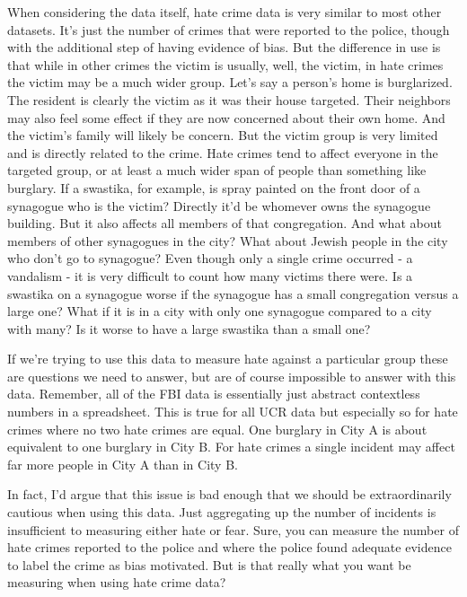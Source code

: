 \documentclass[
]{krantz}
\begin{document}
When considering the data itself, hate crime data is very
similar to most other datasets. It's just the number of
crimes that were reported to the police, though with the
additional step of having evidence of bias. But the
difference in use is that while in other crimes the victim
is usually, well, the victim, in hate crimes the victim may
be a much wider group. Let's say a person's home is
burglarized. The resident is clearly the victim as it was
their house targeted. Their neighbors may also feel some
effect if they are now concerned about their own home. And
the victim's family will likely be concern. But the victim
group is very limited and is directly related to the crime.
Hate crimes tend to affect everyone in the targeted group,
or at least a much wider span of people than something like
burglary. If a swastika, for example, is spray painted on
the front door of a synagogue who is the victim? Directly
it'd be whomever owns the synagogue building. But it also
affects all members of that congregation. And what about
members of other synagogues in the city? What about Jewish
people in the city who don't go to synagogue? Even though
only a single crime occurred - a vandalism - it is very
difficult to count how many victims there were. Is a
swastika on a synagogue worse if the synagogue has a small
congregation versus a large one? What if it is in a city
with only one synagogue compared to a city with many? Is it
worse to have a large swastika than a small one?

If we're trying to use this data to measure hate against a
particular group these are questions we need to answer, but
are of course impossible to answer with this data. Remember,
all of the FBI data is essentially just abstract contextless
numbers in a spreadsheet. This is true for all UCR data but
especially so for hate crimes where no two hate crimes are
equal. One burglary in City A is about equivalent to one
burglary in City B. For hate crimes a single incident may
affect far more people in City A than in City B.

In fact, I'd argue that this issue is bad enough that we
should be extraordinarily cautious when using this data.
Just aggregating up the number of incidents is insufficient
to measuring either hate or fear. Sure, you can measure the
number of hate crimes reported to the police and where the
police found adequate evidence to label the crime as bias
motivated. But is that really what you want be measuring
when using hate crime data?
\end{document}
